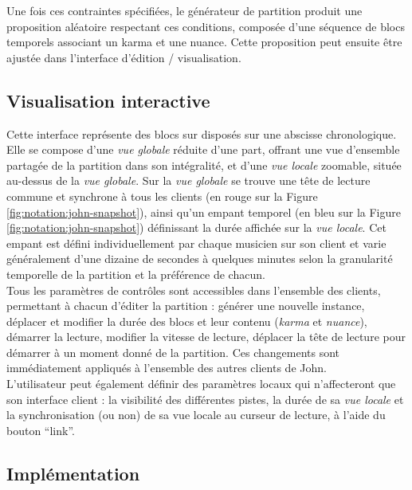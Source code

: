 \noindent Une fois ces contraintes spécifiées, le générateur de partition produit une proposition aléatoire respectant ces conditions, composée d'une séquence de blocs temporels associant un karma et une nuance. Cette proposition peut ensuite être ajustée dans l'interface d'édition / visualisation.

\subsection{Visualisation interactive}

\noindent Cette interface représente des blocs sur disposés sur une abscisse chronologique. Elle se compose d'une \textit{vue globale} réduite d'une part, offrant une vue d'ensemble partagée de la partition dans son intégralité, et d'une \textit{vue locale} zoomable, située au-dessus de la \textit{vue globale}. Sur la \textit{vue globale} se trouve une tête de lecture commune et synchrone à tous les clients (en rouge sur la Figure \ref{fig:notation:john-snapshot}), ainsi qu'un empant temporel (en bleu sur la Figure \ref{fig:notation:john-snapshot}) définissant la durée affichée sur la \textit{vue locale}. Cet empant est défini individuellement par chaque musicien sur son client et varie généralement d'une dizaine de secondes à quelques minutes selon la granularité temporelle de la partition et la préférence de chacun.\\
\indent Tous les paramètres de contrôles sont accessibles dans l'ensemble des clients, permettant à chacun d'éditer la partition : générer une nouvelle instance, déplacer et modifier la durée des blocs et leur contenu (\textit{karma} et \textit{nuance}), démarrer la lecture, modifier la vitesse de lecture, déplacer la tête de lecture pour démarrer à un moment donné de la partition. Ces changements sont immédiatement appliqués à l'ensemble des autres clients de John.\\
\indent L'utilisateur peut également définir des paramètres locaux qui n'affecteront que son interface client : la visibilité des différentes pistes, la durée de sa \textit{vue locale} et la synchronisation (ou non) de sa vue locale au curseur de lecture, à l'aide du bouton ``link''.

\subsection{Implémentation}

